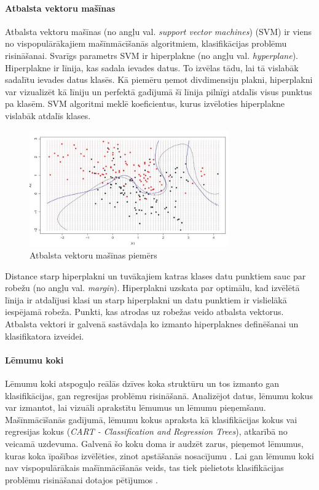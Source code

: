 \paragraph{Atbalsta vektoru mašīnas}
\hfill\par
Atbalsta vektoru mašīnas (no angļu val. \textit{support vector machines}) (SVM) ir viens no vispopulārākajiem mašīnmācīšanās algoritmiem, klasifikācijas problēmu risināšanai. Svarīgs parametrs SVM ir hiperplakne (no angļu val. \textit{hyperplane}). Hiperplakne ir līnija, kas sadala ievades datus. To izvēlas tādu, lai tā vislabāk sadalītu ievades datus klasēs. Kā piemēru ņemot divdimensiju plakni, hiperplakni var vizualizēt kā līniju un perfektā gadījumā šī līnija pilnīgi atdalīs visus punktus pa klasēm. SVM algoritmi meklē koeficientus, kurus izvēloties hiperplakne vislabāk atdalīs klases. 
\begin{figure}[h]%
	\centering
	\includegraphics[height=5cm]{images/svm.png} %
	\caption{Atbalsta vektoru mašīnas piemērs}%
	\label{fig:example}%
\end{figure} 

Distance starp hiperplakni un tuvākajiem katras klases datu punktiem sauc par robežu (no angļu val. \textit{margin}). Hiperplakni uzskata par optimālu, kad izvēlētā līnija ir atdalījusi klasi un starp hiperplakni un datu punktiem ir vislielākā iespējamā robeža. Punkti, kas atrodas uz robežas veido atbalsta vektorus. Atbalsta vektori ir galvenā sastāvdaļa ko izmanto hiperplaknes definēšanai un klasifikatora izveidei.
\paragraph{Lēmumu koki}
\hfill\par
Lēmumu koki atspoguļo reālās dzīves koka struktūru un tos izmanto gan klasifikācijas, gan regresijas problēmu risināšanā. Analizējot datus, lēmumu kokus var izmantot, lai vizuāli aprakstītu lēmumus un lēmumu pieņemšanu. Mašīnmācīšanās gadījumā, lēmumu kokus apraksta kā klasifikācijas kokus vai regresijas kokus (\textit{CART - Classification and Regression Trees}), atkarībā no veicamā uzdevuma.  Galvenā šo koku doma ir audzēt zarus, pieņemot lēmumus, kuras koka īpašības izvēlēties, zinot apstāšanās nosacījumu \cite{dectree}. Lai gan lēmumu koki nav vispopulārākais mašīnmācīšanās veids, tas tiek pielietots klasifikācijas problēmu risināšanai dotajos pētījumos \cite{dectreepaper,pal2003assessment}.
\newpage

